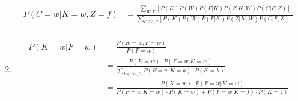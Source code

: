 \documentclass[a4paper,10pt]{article}
\begin{document}
\begin{enumerate}[~~a.)]
\begin{comment}
            P(C=w,K=w,Z=f)=&P(K=w)P(F=w|K=w)P(W=w)P(Z=f|W=w,K=w)P(C=w|F=w,Z=f)\\
            +&P(K=w)P(F=f|K=w)P(W=w)P(Z=f|W=w,K=w)P(C=w|F=f,Z=f)\\
            +&P(K=w)P(F=w|K=w)P(W=f)P(Z=f|W=f,K=w)P(C=w|F=w,Z=f)\\
            +&P(K=w)P(F=f|K=w)P(W=f)P(Z=f|W=f,K=w)P(C=w|F=f,Z=f)\\
            =&0.2\cdot 0.6\cdot 0.4\cdot 0.9\cdot 0.9+0.2\cdot 0.4\cdot 0.4\cdot 0.1\cdot 0.2\\
            +&0.2\cdot 0.6\cdot 0.6\cdot 0.5\cdot 0.9+0.2\cdot 0.4\cdot 0.6\cdot 0.5\cdot 0.2\\
            =& 0.07672\\
            P(C=f,K=w,Z=f)=&P(K=w)P(F=w|K=w)P(W=w)P(Z=f|W=w,K=w)P(C=f|F=w,Z=f)\\
            +&P(K=w)P(F=f|K=w)P(W=w)P(Z=f|W=w,K=w)P(C=f|F=f,Z=f)\\
            +&P(K=w)P(F=w|K=w)P(W=f)P(Z=f|W=f,K=w)P(C=f|F=w,Z=f)\\
            +&P(K=w)P(F=f|K=w)P(W=f)P(Z=f|W=f,K=w)P(C=f|F=f,Z=f)\\
            =&0.2\cdot 0.6\cdot 0.4\cdot 0.9\cdot 0.1+0.2\cdot 0.4\cdot 0.4\cdot 0.1\cdot 0.8\\
            +&0.2\cdot 0.6\cdot 0.6\cdot 0.5\cdot 0.1+0.2\cdot 0.4\cdot 0.6\cdot 0.5\cdot 0.8\\
            =& 0.02968\\
            P(K=w,Z=f)=&P(C=w,K=w,Z=f)+P(C=f,K=W,Z=f)=0.07672+0.02968=0.1064\\
            P(C=w|K=w,Z=f)=&\frac{P(C=w,K=w,Z=f)}{P(K=w,Z=f)} =\frac{0.07672}{0.1064}
            \end{align*}
            \end{comment}
            \begin{align*}
                P(C=w|K=w,Z=f) &= \frac{\sum_{W,F} [P(K)P(W)P(F|K)P(Z|K,W)P(C|F,Z)]}{\sum_{C,W,F} [P(K)P(W)P(F|K)P(Z|K,W)P(C|F,Z)]}\\
            \end{align*}
        \item
            \begin{align*}
            P(K=w|F=w)&=\frac{P(K=w,F=w)}{P(F=w)}\\
            &=\frac{P(K=w)\cdot P(F=w|K=w)}{\sum\limits_{k\in \{w,f\}}^{} P(F=w|K=k) \cdot P(K=k)}\\
            &=\frac{P(K=w)\cdot P(F=w|K=w)}{P(F=w|K=w)\cdot P(K=w)+P(F=w|K=f)\cdot P(K=f)}\\

\end{align*}
\end{enumerate}
\end{document}
